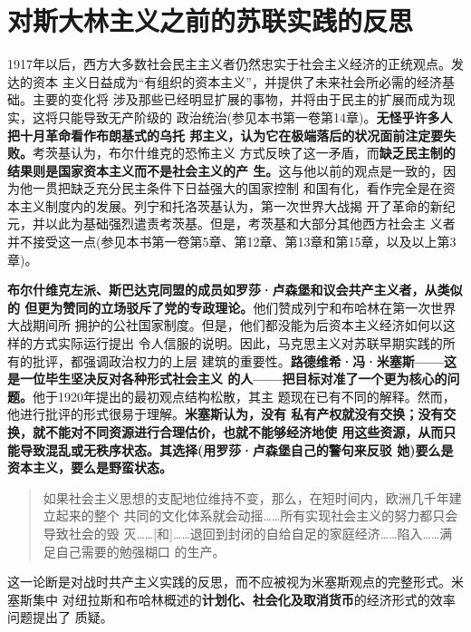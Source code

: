 \section{对斯大林主义之前的苏联实践的反思}

1917年以后，西方大多数社会民主主义者仍然忠实于社会主义经济的正统观点。发达的资本
主义日益成为“有组织的资本主义”，并提供了未来社会所必需的经济基础。主要的变化将
涉及那些已经明显扩展的事物，并将由于民主的扩展而成为现实，这将只能导致无产阶级的
政治统治(参见本书第一卷第14章)。\textbf{无怪乎许多人把十月革命看作布朗基式的乌托
  邦主义，认为它在极端落后的状况面前注定要失败。}考茨基认为，布尔什维克的恐怖主义
方式反映了这一矛盾，而\textbf{缺乏民主制的结果则是国家资本主义而不是社会主义的产
  生。}这与他以前的观点是一致的，因为他一贯把缺乏充分民主条件下日益强大的国家控制
和国有化，看作完全是在资本主义制度内的发展。列宁和托洛茨基认为，第一次世界大战揭
开了革命的新纪元，并以此为基础强烈遣责考茨基。但是，考茨基和大部分其他西方社会主
义者并不接受这一点(参见本书第一卷第5章、第12章、第13章和第15章，以及以上第3章)。

\textbf{布尔什维克左派、斯巴达克同盟的成员如罗莎·卢森堡和议会共产主义者，从类似的
  但更为赞同的立场驳斥了党的专政理论。}他们赞成列宁和布哈林在第一次世界大战期间所
拥护的公社国家制度。但是，他们都没能为后资本主义经济如何以这样的方式实际运行提出
令人信服的说明。因此，马克思主义对苏联早期实践的所有的批评，都强调政治权力的上层
建筑的重要性。\textbf{路德维希·冯·米塞斯——这是一位毕生坚决反对各种形式社会主义
  的人——把目标对准了一个更为核心的问题。}他于1920年提出的最初观点结构松散，其主
题现在已有不同的解释。然而，他进行批评的形式很易于理解。\textbf{米塞斯认为，没有
  私有产权就没有交换；没有交换，就不能对不同资源进行合理估价，也就不能够经济地使
  用这些资源，从而只能导致混乱或无秩序状态。其选择(用罗莎·卢森堡自己的警句来反驳
  她)要么是资本主义，要么是野蛮状态。}
\begin{quotation}
  如果社会主义思想的支配地位维持不变，那么，在短时间内，欧洲几千年建立起来的整个
  共同的文化体系就会动摇……所有实现社会主义的努力都只会导致社会的毁
  灭……[和]……退回到封闭的自给自足的家庭经济……陷入……满足自己需要的勉强糊口
  的生产。
\end{quotation}
这一论断是对战时共产主义实践的反思，而不应被视为米塞斯观点的完整形式。米塞斯集中
对纽拉斯和布哈林概述的\textbf{计划化、社会化及取消货币}的经济形式的效率问题提出了
质疑。

